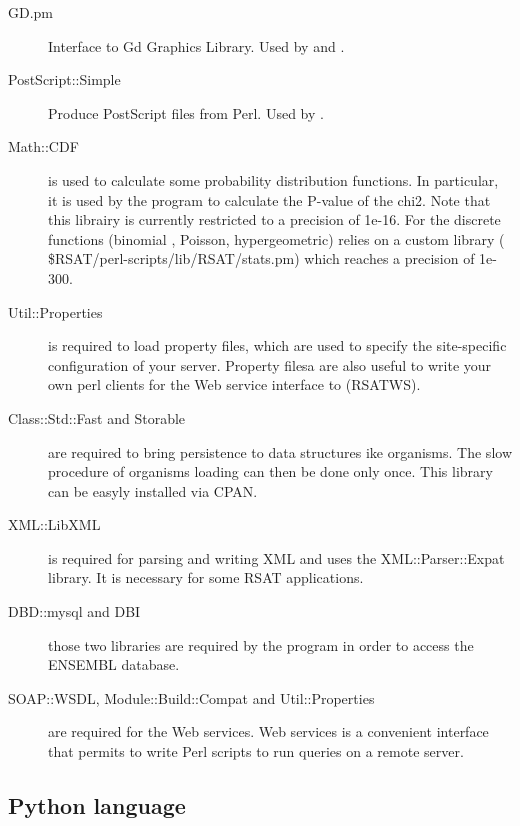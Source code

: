 \documentclass[12pt,a4paper, oneside]{scrreprt} %
\begin{document}
\begin{description}
\item[GD.pm] Interface to Gd Graphics Library. Used by
   and .

\item[PostScript::Simple] Produce PostScript files from Perl. Used by
  .

\item[Math::CDF] is used to calculate some probability distribution
  functions. In particular, it is used by the program
   to calculate the P-value of the
  chi2. Note that this librairy is currently restricted to a precision
  of 1e-16. For the discrete functions (binomial , Poisson,
  hypergeometric) \RSAT relies on a custom library (
  \$RSAT/perl-scripts/lib/RSAT/stats.pm) which reaches a precision of
  1e-300.

\item[Util::Properties] is required to load property files, which are
  used to specify the site-specific configuration of your \RSAT
  server. Property filesa are also useful to write your own perl
  clients for the Web service interface to \RSAT (RSATWS).

\item[Class::Std::Fast and Storable] are required to bring persistence
  to data structures ike organisms. The slow procedure of organisms
  loading can then be done only once. This library can be easyly
  installed via CPAN.

\item[XML::LibXML] is required for parsing and writing XML and uses
  the XML::Parser::Expat library. It is necessary for some RSAT
  applications.

\item[DBD::mysql and DBI] those two libraries are required by the
  program  in order to access the
  ENSEMBL database.

\item[SOAP::WSDL, Module::Build::Compat and Util::Properties] are
  required for the Web services. \RSAT Web services is a convenient
  interface that permits to write Perl scripts to run \RSAT queries on
  a remote server.

\end{description}

\subsection{Python language}
\end{document}
